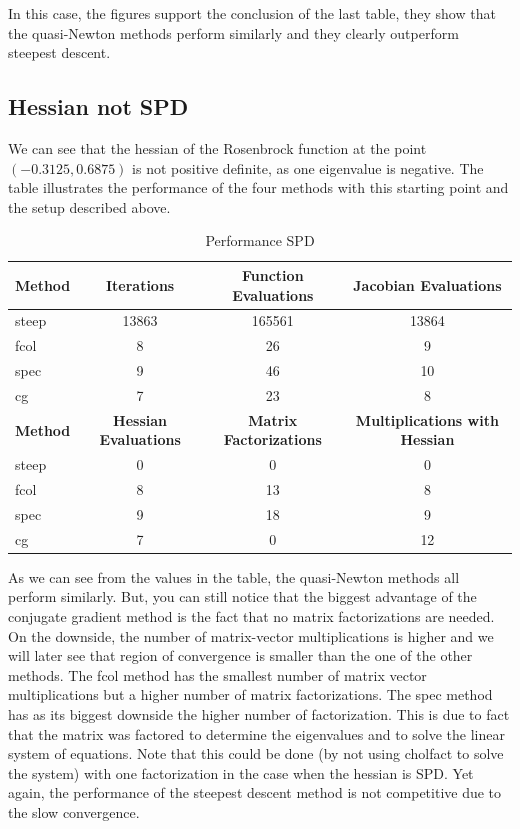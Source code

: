\documentclass{article}
\begin{document}
In this case, the figures support the conclusion of the last table, they show that the quasi-Newton methods perform
similarly and they clearly outperform steepest descent.
\subsection{Hessian not SPD}
We can see that the hessian of the Rosenbrock function at the point $(-0.3125,0.6875)$ is not positive
definite, as one eigenvalue is negative. The  table illustrates the performance
of the four methods with this starting point and the setup described above.
\begin{table}[H]
  \centering
  \begin{tabular}{|l|c|c|c|}
    \hline
   \textbf{Method} & \textbf{Iterations} & \textbf{Function Evaluations} &\textbf{Jacobian Evaluations} \\ \hline
   steep &13863 &165561 &13864 \\ \hline
   fcol &8 &26 &9 \\ \hline
   spec &9 &46 &10 \\ \hline
   cg &7 &23 &8 \\ \hline
 \textbf{Method} & \textbf{Hessian Evaluations} & \textbf{Matrix Factorizations} & \textbf{Multiplications with Hessian} \\ \hline
 steep &0 & 0 & 0 \\ \hline
   fcol &8 &13 &8 \\ \hline
   spec &9 &18 &9 \\ \hline
   cg &7 &0 &12 \\ \hline
  \end{tabular}
  \caption{Performance SPD}
  \label{tab:perform2}
\end{table}
As we can see from the values in the table, the quasi-Newton methods all perform similarly.
But, you can still notice that the biggest advantage of the conjugate gradient method is the fact that no
matrix factorizations are needed. On the downside, the number of matrix-vector multiplications is higher and we
will later see that region of convergence is smaller than the one of the other methods. The fcol method has the
smallest number of matrix vector multiplications but a higher number of matrix factorizations. The spec method
has as its biggest downside the higher number of factorization. This is due to fact that the matrix was factored to determine the eigenvalues and to solve the linear system of equations.
Note that this could be done (by not using cholfact to solve the system) with one factorization in the case when the hessian is SPD. Yet again, the performance of the steepest descent method is not competitive due to the slow convergence. \par
\end{document}
